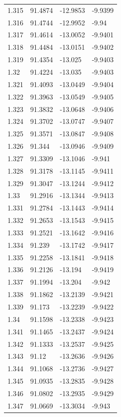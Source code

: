 \begin{tabular}{llll}
1.315 & 91.4874 & -12.9853 & -9.9399 \\
1.316 & 91.4744 & -12.9952 & -9.94 \\
1.317 & 91.4614 & -13.0052 & -9.9401 \\
1.318 & 91.4484 & -13.0151 & -9.9402 \\
1.319 & 91.4354 & -13.025 & -9.9403 \\
1.32 & 91.4224 & -13.035 & -9.9403 \\
1.321 & 91.4093 & -13.0449 & -9.9404 \\
1.322 & 91.3963 & -13.0549 & -9.9405 \\
1.323 & 91.3832 & -13.0648 & -9.9406 \\
1.324 & 91.3702 & -13.0747 & -9.9407 \\
1.325 & 91.3571 & -13.0847 & -9.9408 \\
1.326 & 91.344 & -13.0946 & -9.9409 \\
1.327 & 91.3309 & -13.1046 & -9.941 \\
1.328 & 91.3178 & -13.1145 & -9.9411 \\
1.329 & 91.3047 & -13.1244 & -9.9412 \\
1.33 & 91.2916 & -13.1344 & -9.9413 \\
1.331 & 91.2784 & -13.1443 & -9.9414 \\
1.332 & 91.2653 & -13.1543 & -9.9415 \\
1.333 & 91.2521 & -13.1642 & -9.9416 \\
1.334 & 91.239 & -13.1742 & -9.9417 \\
1.335 & 91.2258 & -13.1841 & -9.9418 \\
1.336 & 91.2126 & -13.194 & -9.9419 \\
1.337 & 91.1994 & -13.204 & -9.942 \\
1.338 & 91.1862 & -13.2139 & -9.9421 \\
1.339 & 91.173 & -13.2239 & -9.9422 \\
1.34 & 91.1598 & -13.2338 & -9.9423 \\
1.341 & 91.1465 & -13.2437 & -9.9424 \\
1.342 & 91.1333 & -13.2537 & -9.9425 \\
1.343 & 91.12 & -13.2636 & -9.9426 \\
1.344 & 91.1068 & -13.2736 & -9.9427 \\
1.345 & 91.0935 & -13.2835 & -9.9428 \\
1.346 & 91.0802 & -13.2935 & -9.9429 \\
1.347 & 91.0669 & -13.3034 & -9.943 \\

\end{tabular}
